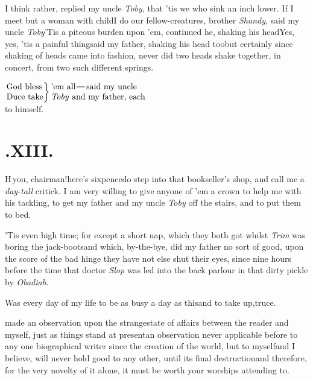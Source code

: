 \documentclass{article}
\begin{document}
I think rather, replied my uncle \textit{Toby}, that ’tis we who sink an inch lower.\tsh
If I meet but a woman with child\tsk I do\pb
{}
our fellow-creatures, brother \textit{Shandy}, said my uncle \textit{Toby}\tsk ’Tis a
piteous burden upon ’em, continued he, shaking his head\tsk Yes, yes, ’tis a painful
thing\tsk said my father, shaking his head too\tsh but certainly since shaking of heads
came into fashion, never did two heads shake together, in concert, from two such
different springs.

\indent$\displaystyle\left.\vcenter{\halign{#\rlap{\phantom{y}}\hss\cr
God bless\cr
Duce take\cr}}\right\}
\vcenter{\halign{#\hss\cr
’em all\tsk said my uncle\cr
\textit{Toby} and my father, each\cr}}$
\\[4pt] to himself.

\smallskip
\section{.\enspace XIII.}

\lettrine{H}{\,}\tsk you,
chairman!\tsk here’s\break
sixpence\tsk do step
into that book\-seller’s shop, and call me a
\textit{day-tall}\break
critick. I am very willing to give any\pb one of ’em a crown to help me
with his tackling, to get my father and my uncle \textit{Toby} off
the stairs, and to put them to bed.\tsk

\tsk ’Tis even high time; for except a short nap, which
they both got whilst \textit{Trim} was boring the
jack-boots\tsk and which, by-the-bye, did my father no sort of
good, upon the score of the bad hinge\break
\tsk they have not else shut their eyes, since
nine hours before the time that doctor \textit{Slop} was led into the
back parlour in that dirty pickle by \textit{Obadiah}.

Was every day of my life to be as\break
busy a day as this\tsk and to take up,\tsk truce.

\noindent
{}
made an observation upon the strange\pb state of affairs between the reader and myself,
just as things stand at present\tsk an observation never
applicable before to any one biographical writer since the creation
of the world, but to myself\tsk and I believe, will never hold
good to any other, until its final destruction\tsk and therefore,
for the very novelty of it alone, it must be worth your worships
attending to.
\end{document}
